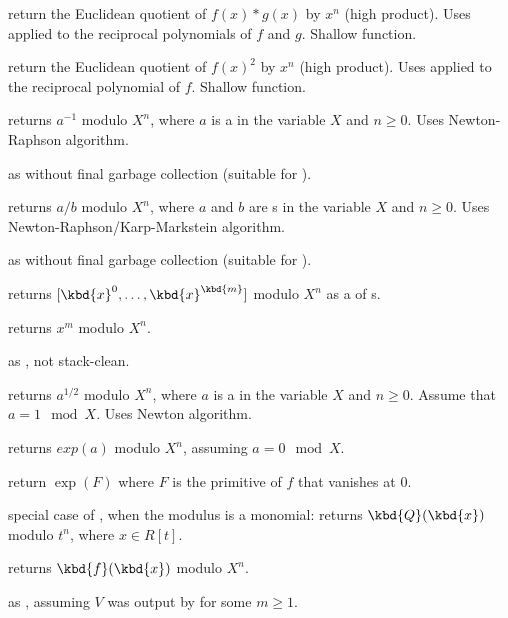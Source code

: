  return the Euclidean quotient
of $f(x)*g(x)$ by $x^n$ (high product). Uses  applied to
the reciprocal polynomials of $f$ and $g$. Shallow function.

 return the Euclidean quotient
of $f(x)^2$ by $x^n$ (high product). Uses  applied to
the reciprocal polynomial of $f$. Shallow function.

 returns $a^{-1}$ modulo $X^n$,
where $a$ is a  in the variable $X$ and $n \geq 0$. Uses
Newton-Raphson algorithm.

 as  without final garbage
collection (suitable for ).

 returns $a/b$ modulo $X^n$,
where $a$ and $b$ are s in the variable $X$ and $n \geq 0$. Uses
Newton-Raphson/Karp-Markstein algorithm.

 as  without final garbage
collection (suitable for ).

 returns $[\kbd{x}^0,
\dots, \kbd{x}^\kbd{m}]$ modulo $X^n$ as a  of s.

 returns $x^m$ modulo
$X^n$.

 as ,
not stack-clean.

 returns $a^{1/2}$ modulo $X^n$,
where $a$ is a  in the variable $X$ and $n \geq 0$.
Assume that $a = 1 \mod{X}$. Uses Newton algorithm.

 returns $exp(a)$ modulo $X^n$, assuming
$a = 0 \mod{X}$.

 return $\exp(F)$
where $F$ is the primitive of $f$ that vanishes at $0$.

 special case of
, when the modulus is a monomial:
returns $\kbd{Q}(\kbd{x})$ modulo $t^n$, where $x \in R[t]$.

 returns $\kbd{f}(\kbd{x})$ modulo
$X^n$.

 as ,
assuming $V$ was output by  for some $m\geq 1$.

